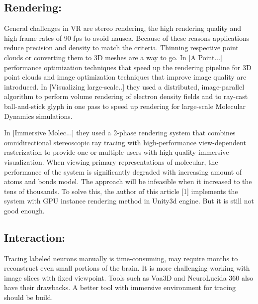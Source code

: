 \documentclass[10pt,twocolumn,letterpaper]{article}
\begin{document}
\subsection{Rendering:}
General challenges in VR are stereo rendering, the high rendering quality and high frame rates of 90 fps to avoid nausea. Because of these reasons applications reduce precision and density to match the criteria. Thinning respective point clouds or converting them to 3D meshes are a way to go. In [A Point...] performance optimization techniques that speed up the rendering pipeline for 3D point clouds and image optimization techniques that improve image quality are introduced. In [Visualizing large-scale..] they used a distributed, image-parallel algorithm to perform volume rendering of electron density fields and to ray-cast ball-and-stick glyph in one pass to speed up rendering for large-scale Molecular Dynamics simulations.

\setlength{\parindent}{1pc}
 In [Immersive Molec...] they used a 2-phase rendering system that combines omnidirectional stereoscopic ray tracing with high-performance view-dependent rasterization to provide one or multiple users with high-quality immersive visualization. When viewing primary representations of molecular, the performance of the system is significantly degraded with increasing amount of atoms and bonds model. The approach will be infeasible when it increased to the tens of thousands. To solve this, the author of this article [1] implements the system with GPU instance rendering method in Unity3d engine. But it is still not good enough. 




\subsection{Interaction:}Tracing labeled neurons manually is time-consuming, may require months to reconstruct even small portions of the brain. It is more challenging working with image slices with fixed viewpoint. Tools such as Vaa3D and NeuroLucida 360 also have their drawbacks. A better tool with immersive environment for tracing should be build.
\end{document}
